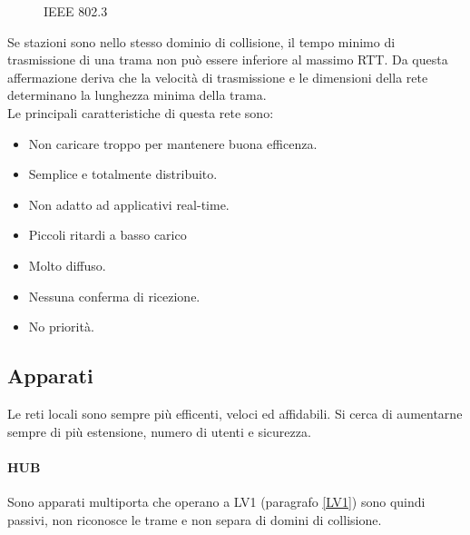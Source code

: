 \documentclass[12pt]{article}
\begin{document}
\begin{figure}[!hbpt]
\begin{minipage}{.45\textwidth}
    \caption{IEEE 802.3}
    \label{fig:ieee8023}
  \end{minipage}\hfill
\end{figure}
Se stazioni sono nello stesso dominio di collisione, il tempo minimo di trasmissione di una trama non può essere inferiore al massimo RTT. Da questa affermazione deriva che la velocità di trasmissione e le dimensioni della rete determinano la lunghezza minima della trama.\\
Le principali caratteristiche di questa rete sono:
\begin{itemize}
  \item Non caricare troppo per mantenere buona efficenza.
  \item Semplice e totalmente distribuito.
  \item Non adatto ad applicativi real-time.
  \item Piccoli ritardi a basso carico
  \item Molto diffuso.
  \item Nessuna conferma di ricezione.
  \item No priorità.
\end{itemize}
\subsection{Apparati}
Le reti locali sono sempre più efficenti, veloci ed affidabili. Si cerca di aumentarne sempre di più estensione, numero di utenti e sicurezza.
\paragraph{HUB}
Sono apparati multiporta che operano a LV1 (paragrafo \ref{LV1}) sono quindi passivi, non riconosce le trame e non separa di domini di collisione.
\end{document}

